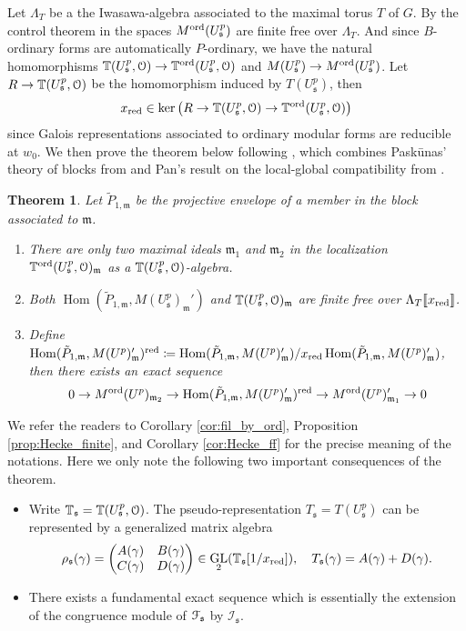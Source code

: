 \documentclass[leqno]{amsart}
\newtheorem{thm}{Theorem}[section]
\theoremstyle{definition}
\theoremstyle{remark}
\newcommand{\eo}{\EuScript{O}}
\DeclareMathOperator{\Hom}{Hom}
\DeclareMathOperator{\GL}{GL}
\newcommand{\fm}{\mathfrak{m}}
\newcommand{\fs}{\mathfrak{s}}
\newcommand{\red}{\textnormal{red}}
\newcommand{\xx}{x_\textnormal{red}}
\newcommand{\TT}{\mathbb{T}} %
\newcommand{\euF}{\EuScript{F}} %
\newcommand{\I}{\mathcal{I}} %
\newcommand{\ord}{\textnormal{ord}} %
\begin{document}
Let $\Lambda_T$ be a the Iwasawa-algebra
associated to the maximal torus $T$ of $G$.
By the control theorem in \cite{ger}
the spaces $M^{\ord}(U^p_\fs)$ are finite free over $\Lambda_T$.
And since $B$-ordinary forms are automatically $P$-ordinary,
we have the natural homomorphisms 
$\TT(U^p_\fs,\eo)\to \TT^{\ord}(U^p_\fs,\eo)$ and
$M(U^p_\fs)\to M^{\ord}(U^p_\fs)$.
Let $R\to \TT(U^p_\fs,\eo)$ be the homomorphism
induced by $T(U^p_\fs)$, then 
\[
    \xx\in \ker\big(R\to \TT(U^p_\fs,\eo)\to \TT^{\ord}(U^p_\fs,\eo)\big)
\]
since Galois representations associated to ordinary modular forms
are reducible at $w_0$.
We then prove the theorem below following \cite[\S 5]{urban},
which combines Pask\={u}nas' theory of blocks from \cite{pask} and
Pan's result on the local-global compatibility from \cite{pan}.

\begin{thm}
    Let $\tilde{P}_{1,\fm}$ be the projective envelope
    of a member in the block associated to $\fm$.
    \begin{enumerate}
    \item There are only two maximal ideals $\fm_1$ and $\fm_2$
    in the localization $\TT^{\ord}(U^p_\fs,\eo)_\fm$ 
    as a $\TT(U^p_\fs,\eo)$-algebra.
    \item Both $\Hom(\tilde{P}_{1,\fm},M(U^p_\fs)_\fm')$
    and $\TT(U^p_\fs,\eo)_\fm$ 
    are finite free over 
    $\Lambda_T\llbracket\xx\rrbracket$.
    \item Define
    $\Hom(\tilde{P}_{1,\fm},M(U^p)_{\fm}')^\red\coloneqq
	\Hom(\tilde{P}_{1,\fm},M(U^p)_{\fm}')/\xx
	\Hom(\tilde{P}_{1,\fm},M(U^p)_{\fm}')$,
    then there exists an exact sequence 
    \[
    0\to M^{\ord}(U^p)_{\fm_2}\to
    \Hom(\tilde{P}_{1,\fm},M(U^p)_{\fm}')^\red
    \to M^{\ord}(U^p)_{\fm_1}'\to0 
    \]
    \end{enumerate}
\end{thm}
We refer the readers to
Corollary \ref{cor:fil_by_ord},
Proposition \ref{prop:Hecke_finite}, and
Corollary \ref{cor:Hecke_ff} for the precise meaning
of the notations. 
Here we only note the following two important 
consequences of the theorem.
\begin{itemize}
\item Write $\TT_\fs=\TT(U^p_\fs,\eo)$.
The pseudo-representation $T_\fs=T(U^p_\fs)$
can be represented by a generalized matrix algebra
\[
    \rho_\fs(\gamma)=
    \begin{pmatrix}
        A(\gamma) & B(\gamma)\\
        C(\gamma) & D(\gamma)
    \end{pmatrix}\in \GL_2(\TT_\fs[1/\xx]),\quad
    T_\fs(\gamma)=A(\gamma)+D(\gamma).
\]
\item There exists a fundamental exact sequence 
which is essentially the extension of the congruence module
of $\euF_\fs$ by $\I_\fs$.
\end{itemize}
\end{document}
